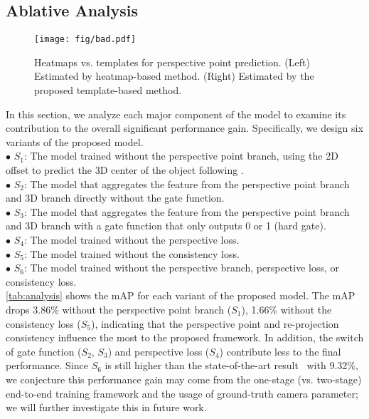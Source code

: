\documentclass{article}
\begin{document}
\subsection{Ablative Analysis}
\label{sec:ablative}

\begin{figure}[t!]
    \begin{center}
        \texttt{[image: fig/bad.pdf]}
    \end{center}
    \vspace{-6pt}
    \caption{Heatmaps vs. templates for perspective point prediction. (Left) Estimated by heatmap-based method. (Right) Estimated by the proposed template-based method.}
    \label{fig:heatmap}
\end{figure}

In this section, we analyze each major component of the model to examine its contribution to the overall significant performance gain. Specifically, we design six variants of the proposed model.\\
$\bullet$ $S_1$: The model trained without the perspective point branch, using the 2D offset to predict the 3D center of the object following \citet{huang2018cooperative}. \\
$\bullet$ $S_2$: The model that aggregates the feature from the perspective point branch and 3D branch directly without the gate function. \\
$\bullet$ $S_3$: The model that aggregates the feature from the perspective point branch and 3D branch with a gate function that only outputs 0 or 1 (hard gate). \\
$\bullet$ $S_4$: The model trained without the perspective loss. \\
$\bullet$ $S_5$: The model trained without the consistency loss. \\
$\bullet$ $S_6$: The model trained without the perspective branch, perspective loss, or consistency loss.\\
\autoref{tab:analysis} shows the mAP for each variant of the proposed model. The mAP drops 3.86\% without the perspective point branch ($S_1$), 1.66\% without the consistency loss ($S_5$), indicating that the perspective point and re-projection consistency influence the most to the proposed framework. In addition, the switch of gate function ($S_2$, $S_3$) and perspective loss ($S_4$) contribute less to the final performance. Since $S_6$ is still higher than the state-of-the-art result~\cite{huang2018cooperative} with 9.32\%, we conjecture this performance gain may come from the one-stage (vs. two-stage) end-to-end training framework and the usage of ground-truth camera parameter; we will further investigate this in future work.
\end{document}
